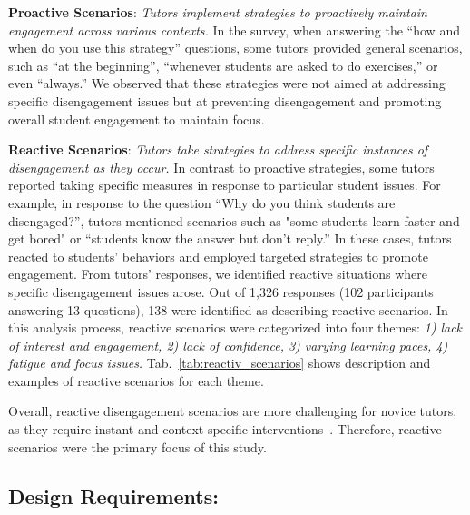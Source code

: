 \textbf{Proactive Scenarios}: \textit{Tutors implement strategies to proactively maintain engagement across various contexts.} In the survey, when answering the ``how and when do you use this strategy'' questions, some tutors provided general scenarios, such as ``at the beginning'', ``whenever students are asked to do exercises,'' or even ``always.'' We observed that these strategies were not aimed at addressing specific disengagement issues but at preventing disengagement and promoting overall student engagement to maintain focus.

\textbf{Reactive Scenarios}: \textit{Tutors take strategies to address specific instances of disengagement as they occur.} In contrast to proactive strategies, some tutors reported taking specific measures in response to particular student issues. For example, in response to the question ``Why do you think students are disengaged?'', tutors mentioned scenarios such as "some students learn faster and get bored" or ``students know the answer but don't reply.'' In these cases, tutors reacted to students' behaviors and employed targeted strategies to promote engagement. From tutors' responses, we identified reactive situations where specific disengagement issues arose. Out of 1,326 responses (102 participants answering 13 questions), 138 were identified as describing reactive scenarios. 
In this analysis process, reactive scenarios were categorized into four themes: \textit{1) lack of interest and engagement, 2) lack of confidence, 3) varying learning paces, 4) fatigue and focus issues.} Tab.~\ref{tab:reactiv_scenarios} shows description and examples of reactive scenarios for each theme. 

Overall, reactive disengagement scenarios are more challenging for novice tutors, as they require instant and context-specific interventions~\cite{park2022frustration}. Therefore, reactive scenarios were the primary focus of this study.


\subsection{Design Requirements:}
